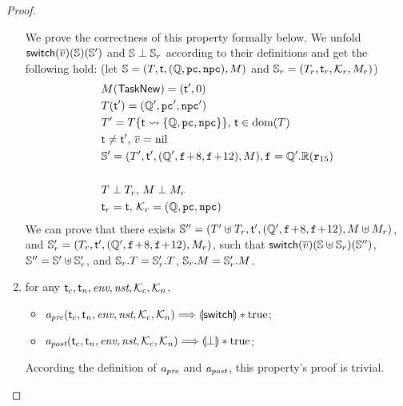 \begin{proof}
\begin{enumerate}
        We prove the correctness of this property formally 
        below. We unfold $\mathsf{switch}(\overline{v})(\mathbb{S})(\mathbb{S}')$ 
        and $\mathbb{S}\perp\mathbb{S}_r$ according to their definitions 
        and get the following hold: 
        (let $\mathbb{S} = (T, \textsf{t}, (\mathbb{Q}, \texttt{pc}, \texttt{npc}), M)$ and 
        $\mathbb{S}_r = (T_r, \textsf{t}_r, \mathcal{K}_r, M_r)$)
        \begin{align}
            & M(\mathsf{TaskNew}) = (\textsf{t}', 0) \\
            & T(\textsf{t}') = (\mathbb{Q}', \texttt{pc}', \texttt{npc}') \\
            & T' = T\{ \textsf{t} \leadsto \{ \mathbb{Q}, \texttt{pc}, \texttt{npc} \} \}, \,
                \textsf{t} \in \text{dom}(T) \\
            & \textsf{t} \neq \textsf{t}', \, \overline{v} = \text{nil} \\
            & \mathbb{S}' = (T', \textsf{t}', (\mathbb{Q}', \texttt{f}_{}\!+\!8, \texttt{f}_{}\!+\!12), 
                M{}), \texttt{f}_{} = \mathbb{Q}'.\mathbb{R}(\texttt{r}_{15}) \\
            & \notag \\
            & T \perp T_r, \, M \perp M_r \\
            & \textsf{t}_r = \textsf{t}, \, \mathcal{K}_r = (\mathbb{Q}, \texttt{pc}, \texttt{npc})
        \end{align}
        We can prove that there exists 
        $\mathbb{S}'' = (T'\uplus T_r, \textsf{t}', 
            (\mathbb{Q}', \texttt{f}_{}\!+\!8, \texttt{f}_{}\!+\!12), M\uplus M_r)$, 
        and 
        $\mathbb{S}_r' = (T_r, \textsf{t}', 
            (\mathbb{Q}', \texttt{f}_{}\!+\!8, \texttt{f}_{}\!+\!12), M_r)$, 
        such that 
        $\mathsf{switch}(\overline{v})(\mathbb{S} \uplus \mathbb{S}_r)(\mathbb{S}'')$,
        $\mathbb{S}'' = \mathbb{S}' \uplus \mathbb{S}_r'$, 
        and $\mathbb{S}_r.T = \mathbb{S}_r'.T$, 
        $\mathbb{S}_r.M = \mathbb{S}_r'.M$.
        \vspace*{0.5em}
        
        \item for any $\textsf{t}_c, \textsf{t}_n, \textit{env}, \textit{nst}, \mathcal{K}_c, \mathcal{K}_n$,
            \begin{itemize}
                \item $\textit{a}_\textit{pre}(\textsf{t}_c, \textsf{t}_n, \textit{env}, \textit{nst}, \mathcal{K}_c, \mathcal{K}_n) 
                    \Longrightarrow \llparenthesis {\mathsf{switch}} \rrparenthesis * \text{true}$; 
                \item $\textit{a}_\textit{post}(\textsf{t}_c, \textsf{t}_n, \textit{env}, \textit{nst}, \mathcal{K}_c, \mathcal{K}_n) 
                    \Longrightarrow \llparenthesis {\perp} \rrparenthesis * \text{true}$; 
            \end{itemize}   
        \vspace*{0.3em}
        According the definition of $\textit{a}_\textit{pre}$ and $\textit{a}_\textit{post}$, 
        this property's proof is trivial.
        \vspace*{0.5em}
        

\end{enumerate}
\end{proof}
